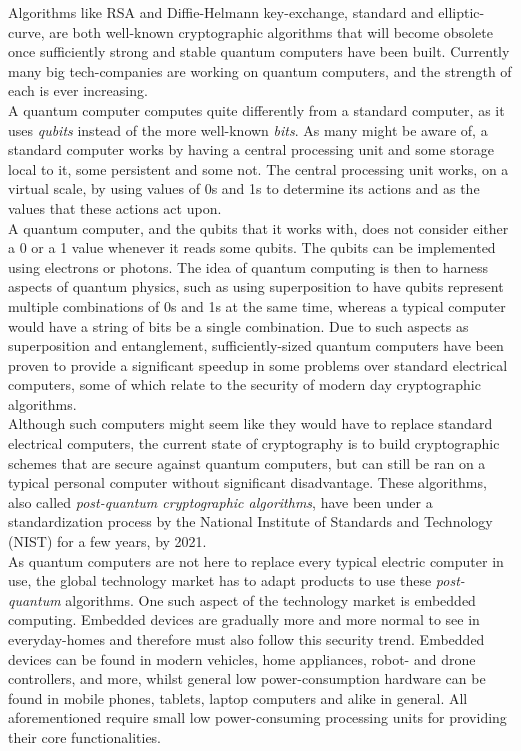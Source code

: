 Algorithms like RSA and Diffie-Helmann key-exchange, standard and elliptic-curve, are both well-known cryptographic algorithms that will become obsolete once sufficiently strong and stable quantum computers have been built. Currently many big tech-companies are working on quantum computers, and the strength of each is ever increasing.\medskip\\
A quantum computer computes quite differently from a standard computer, as it uses \emph{qubits} instead of the more well-known \emph{bits}. As many might be aware of, a standard computer works by having a central processing unit and some storage local to it, some persistent and some not. The central processing unit works, on a virtual scale, by using values of 0s and 1s to determine its actions and as the values that these actions act upon.\medskip\\
A quantum computer, and the qubits that it works with, does not consider either a 0 or a 1 value whenever it reads some qubits. The qubits can be implemented using electrons or photons. The idea of quantum computing is then to harness aspects of quantum physics, such as using superposition to have qubits represent multiple combinations of 0s and 1s at the same time, whereas a typical computer would have a string of bits be a single combination. Due to such aspects as superposition and entanglement, sufficiently-sized quantum computers have been proven to provide a significant speedup in some problems over standard electrical computers, some of which relate to the security of modern day cryptographic algorithms.\medskip\\
Although such computers might seem like they would have to replace standard electrical computers, the current state of cryptography is to build cryptographic schemes that are secure against quantum computers, but can still be ran on a typical personal computer without significant disadvantage. These algorithms, also called \emph{post-quantum cryptographic algorithms}, have been under a standardization process by the National Institute of Standards and Technology (NIST) for a few years, by 2021.\medskip\\
As quantum computers are not here to replace every typical electric computer in use, the global technology market has to adapt products to use these \emph{post-quantum} algorithms. One such aspect of the technology market is embedded computing. Embedded devices are gradually more and more normal to see in everyday-homes and therefore must also follow this security trend. Embedded devices can be found in modern vehicles, home appliances, robot- and drone controllers, and more, whilst general low power-consumption hardware can be found in mobile phones, tablets, laptop computers and alike in general. All aforementioned require small low power-consuming processing units for providing their core functionalities.\medskip\\
